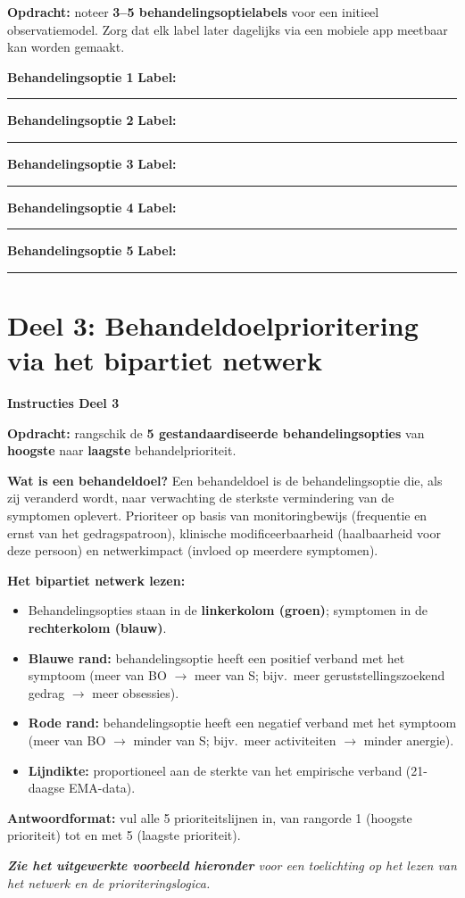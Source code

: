 \documentclass[11pt,a4paper]{article}
\newcommand{\behandelingsoptieslot}[1]{%
\vspace{0.25em}\noindent
\begin{tcolorbox}[colback=SoftBG,colframe=BorderGrey,boxrule=0.4pt,arc=1.5mm,left=8pt,right=8pt,top=5pt,bottom=5pt]%
\small\textbf{\color{SlateMid}Behandelingsoptie #1}\hspace{1em}%
\textbf{Label:}\hspace{0.5em}\rule{0.56\linewidth}{0.25pt}%
\end{tcolorbox}%
}
\begin{document}
\begin{responsebox}
\small\textbf{Opdracht:} noteer \textbf{3--5 behandelingsoptielabels} voor een initieel observatiemodel.
Zorg dat elk label later dagelijks via een mobiele app meetbaar kan worden gemaakt.

\behandelingsoptieslot{1}
\behandelingsoptieslot{2}
\behandelingsoptieslot{3}
\behandelingsoptieslot{4}
\behandelingsoptieslot{5}
\end{responsebox}

\vspace{0.6em}
\newpage


\section{Deel 3: Behandeldoelprioritering via het bipartiet netwerk}

\begin{tcolorbox}[colback=yellow!5,colframe=GoldAmber,arc=2.5mm,boxrule=0.9pt,
  left=10pt,right=10pt,top=9pt,bottom=9pt]
\textbf{\color{GoldAmber}Instructies Deel 3}

\smallskip\small
\textbf{Opdracht:} rangschik de \textbf{5 gestandaardiseerde behandelingsopties} van
\textbf{hoogste} naar \textbf{laagste} behandelprioriteit.

\textbf{Wat is een behandeldoel?}
Een behandeldoel is de behandelingsoptie die, als zij veranderd wordt, naar verwachting de
sterkste vermindering van de symptomen oplevert. Prioriteer op basis van monitoringbewijs
(frequentie en ernst van het gedragspatroon), klinische modificeerbaarheid
(haalbaarheid voor deze persoon) en netwerkimpact (invloed op meerdere symptomen).

\textbf{Het bipartiet netwerk lezen:}
\begin{itemize}[topsep=2pt,itemsep=1pt]
\item Behandelingsopties staan in de \textbf{linkerkolom (groen)}; symptomen in de \textbf{rechterkolom (blauw)}.
\item \textbf{Blauwe rand:} behandelingsoptie heeft een positief verband met het symptoom
(meer van BO $\rightarrow$ meer van S; bijv.\ meer geruststellingszoekend gedrag $\rightarrow$ meer obsessies).
\item \textbf{Rode rand:} behandelingsoptie heeft een negatief verband met het symptoom
(meer van BO $\rightarrow$ minder van S; bijv.\ meer activiteiten $\rightarrow$ minder anergie).
\item \textbf{Lijndikte:} proportioneel aan de sterkte van het empirische verband
(21-daagse EMA-data).
\end{itemize}

\textbf{Antwoordformat:} vul alle 5 prioriteitslijnen in, van rangorde 1 (hoogste prioriteit)
tot en met 5 (laagste prioriteit).

\medskip
\textit{\textbf{Zie het uitgewerkte voorbeeld hieronder} voor een toelichting op het lezen van het netwerk en de prioriteringslogica.}
\end{tcolorbox}
\end{document}

